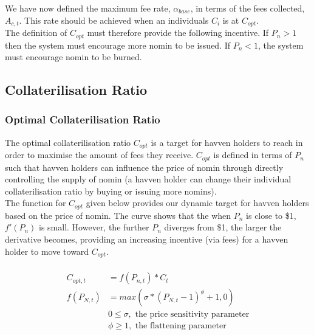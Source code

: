\noindent We have now defined the maximum fee rate, $\alpha_{base}$, in terms of the fees collected, $A_{c,t}$. This rate should be achieved when an individuals $C_i$ is at $C_{opt}$. \\

\noindent The definition of $C_{opt}$ must therefore provide the following incentive. If $P_n > 1$ then the system must encourage more nomin to be issued. If $P_n < 1$, the system must encourage nomin to be burned. 

\newpage

\subsection{Collaterilisation Ratio}
\subsubsection{Optimal Collaterilisation Ratio}

\noindent The optimal collaterilisation ratio $C_{opt}$ is a target for havven holders to reach in order to maximise the amount of fees they receive. $C_{opt}$ is defined in terms of $P_n$ such that havven holders can influence the price of nomin through directly controlling the supply of nomin (a havven holder can change their individual collaterilisation ratio by buying or issuing more nomins). \\
 
\noindent The function for $C_{opt}$ given below provides our dynamic target for havven holders based on the price of nomin. The curve shows that the when $P_n$ is close to \$1, $ f'(P_n) $ is small. However, the further $P_n$ diverges from \$1, the larger the derivative becomes, providing an increasing incentive (via fees) for a havven holder to move toward $C_{opt}$.

\begin{gather} 
\begin{align}
\begin{split}
C_{opt,t} &= f(P_{n,t}) * C_t  \\ 
f(P_{N,t}) &= max(\sigma * (P_{N,t} - 1)^{\phi} + 1, 0) \\
& 0 \leq \sigma, \text{ the price sensitivity parameter} \\
& \phi \geq 1, \text{ the flattening parameter} \\
\end{split}
\end{align}
\end{gather}


